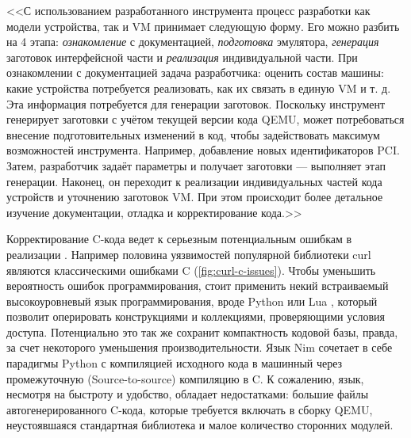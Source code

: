 <<С использованием разработанного инструмента процесс разработки как модели устройства,
так и VM принимает следующую форму.
Его можно разбить на 4 этапа: \textit{ознакомление} с документацией, \textit{подготовка} эмулятора,
\textit{генерация} заготовок интерфейсной части и \textit{реализация} индивидуальной части.
При ознакомлении с документацией задача разработчика: оценить состав
машины: какие устройства потребуется реализовать, как их связать в единую
VM и т. д. Эта информация потребуется для генерации заготовок. Поскольку
инструмент генерирует заготовки с учётом текущей версии кода QEMU,
может потребоваться внесение подготовительных изменений в код, чтобы
задействовать максимум возможностей инструмента. Например, добавление
новых идентификаторов PCI. Затем, разработчик задаёт параметры и получает
заготовки — выполняет этап генерации. Наконец, он переходит к реализации
индивидуальных частей кода устройств и уточнению заготовок VM. При этом
происходит более детальное изучение документации, отладка и
корректирование кода.>>

Корректирование C-кода ведет к серьезным потенциальным ошибкам в реализации \cite{qemu-c-style}.
Например половина уязвимостей популярной библиотеки curl \cite{curl} являются
классическими ошибками C \cite{curl-errors} (\cref{fig:curl-c-issues}).
Чтобы уменьшить вероятность ошибок программирования, стоит применить некий встраиваемый
высокоуровневый язык программирования, вроде Python \cite{python} или Lua \cite{lua},
который позволит оперировать конструкциями и коллекциями, проверяющими условия доступа.
Потенциально это так же сохранит компактность кодовой базы,
правда, за счет некоторого уменьшения производительности. \label{better-logic}
Язык Nim \cite{nim} сочетает в себе парадигмы Python с компиляцией исходного кода в машинный через
промежуточную (Source-to-source) компиляцию в C. К сожалению, язык, несмотря на быстроту и удобство, обладает
недостатками: большие файлы автогенерированного C-кода, которые требуется включать в сборку QEMU,
неустоявшаяся стандартная библиотека и малое количество сторонних модулей.

